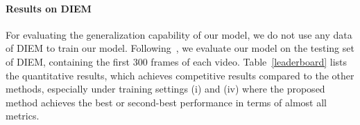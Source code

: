 \documentclass[review]{elsarticle}
\begin{document}
\paragraph{Results on DIEM} For evaluating the generalization capability of our model, we do not use any data of DIEM to train our model.
Following~\cite{hossein2015many, lai2019video}, we evaluate our model on the testing set of DIEM, containing the first $300$ frames of each video.
Table~\ref{leaderboard} lists the quantitative results, which achieves competitive results compared to the other methods, especially under training settings (i) and (iv) where the proposed method achieves the best or second-best performance in terms of almost all metrics.


\renewcommand\arraystretch{0.7}
\begin{table*}[t]
\caption{Results of ablative experiments of the proposed model on the UCF sports testing set. The best scores are marked in \textbf{bold}. The symbol '\textit{w/o.}' denotes removing a specific module.}\smallskip
\centering
{}
\label{ablation}
\end{table*}
\end{document}
